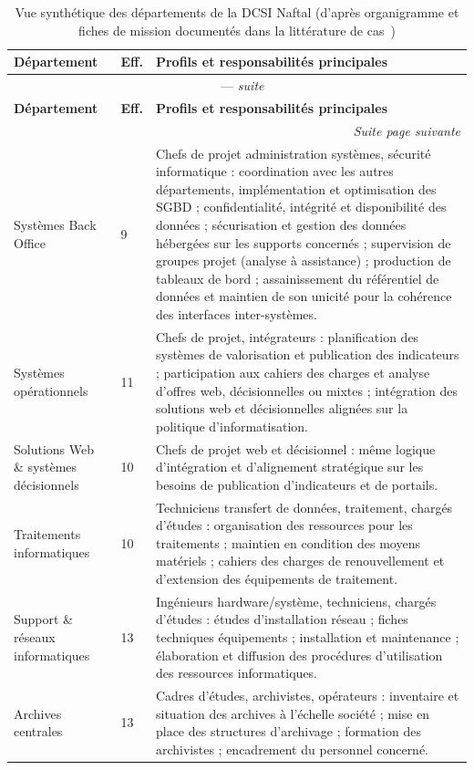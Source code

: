 \begin{longtable}{@{}p{3.6cm}p{1.1cm}p{9.3cm}@{}}
\caption{Vue synthétique des départements de la DCSI Naftal (d'après organigramme et fiches de
mission documentés dans la littérature de cas~\cite{meghari2014})\label{tab:dcsi_depts}} \\
\toprule
\textbf{Département} & \textbf{Eff.} & \textbf{Profils et responsabilités principales} \\
\midrule
\endfirsthead
\multicolumn{3}{c}{\tablename\ \thetable{} — \textit{suite}} \\
\toprule
\textbf{Département} & \textbf{Eff.} & \textbf{Profils et responsabilités principales} \\
\midrule
\endhead
\midrule
\multicolumn{3}{r}{\textit{Suite page suivante}} \\
\endfoot
\bottomrule
\endlastfoot
Systèmes Back Office &
9 &
Chefs de projet administration systèmes, sécurité informatique : coordination avec les autres
départements, implémentation et optimisation des SGBD ; confidentialité, intégrité et disponibilité
des données ; sécurisation et gestion des données hébergées sur les supports concernés ;
supervision de groupes projet (analyse à assistance) ; production de tableaux de bord ;
assainissement du référentiel de données et maintien de son unicité pour la cohérence des
interfaces inter-systèmes. \\
\midrule
Systèmes opérationnels &
11 &
Chefs de projet, intégrateurs : planification des systèmes de valorisation et publication des
indicateurs ; participation aux cahiers des charges et analyse d'offres web, décisionnelles ou
mixtes ; intégration des solutions web et décisionnelles alignées sur la politique
d'informatisation. \\
\midrule
Solutions Web \& systèmes décisionnels &
10 &
Chefs de projet web et décisionnel : même logique d'intégration et d'alignement stratégique sur
les besoins de publication d'indicateurs et de portails. \\
\midrule
Traitements informatiques &
10 &
Techniciens transfert de données, traitement, chargés d'études : organisation des ressources pour
les traitements ; maintien en condition des moyens matériels ; cahiers des charges de
renouvellement et d'extension des équipements de traitement. \\
\midrule
Support \& réseaux informatiques &
13 &
Ingénieurs hardware/système, techniciens, chargés d'études : études d'installation réseau ; fiches
techniques équipements ; installation et maintenance ; élaboration et diffusion des procédures
d'utilisation des ressources informatiques. \\
\midrule
Archives centrales &
13 &
Cadres d'études, archivistes, opérateurs : inventaire et situation des archives à l'échelle
société ; mise en place des structures d'archivage ; formation des archivistes ; encadrement du
personnel concerné. \\
\end{longtable}

